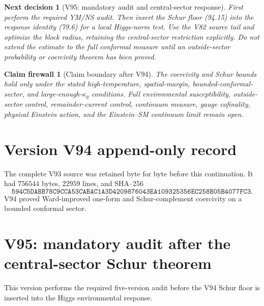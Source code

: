 \documentclass[11pt]{article}
\newtheorem{firewall}[theorem]{Claim firewall}
\newtheorem{decision}[theorem]{Next decision}
\theoremstyle{remark}
\begin{document}
\begin{decision}[V95: mandatory audit and central-sector response]
\label{dec:v17v94-next}
First perform the required YM/NS audit.  Then insert the Schur floor
(94.15) into the response identity (79.6) for a local Higgs-norm test.
Use the V82 source tail and optimize the block radius, retaining the
central-sector restriction explicitly.  Do not extend the estimate to
the full conformal measure until an outside-sector probability or
coercivity theorem has been proved.
\end{decision}

\begin{firewall}[Claim boundary after V94]
\label{fire:v17v94}
The coercivity and Schur bounds hold only under the stated
high-temperature, spatial-margin, bounded-conformal-sector, and
large-enough-\(\kappa_g\) conditions.  Full environmental
susceptibility, outside-sector control, remainder-current control,
continuum measure, gauge cofinality, physical Einstein action, and the
Einstein--SM continuum limit remain open.
\end{firewall}

\section*{Version V94 append-only record}
The complete V93 source was retained byte for byte before this
continuation.  It had \(756544\) bytes, \(22959\) lines, and SHA--256
\[
 \texttt{594C5DABB78C9CCA53CABAC1A3D4209876043EA109325356EC258B05B4077FC3}.
\]
V94 proved Ward-improved one-form and Schur-complement coercivity on a
bounded conformal sector.


\section{V95: mandatory audit after the central-sector Schur theorem}
\label{sec:v17v95}

This version performs the required five-version audit before the
V94 Schur floor is inserted into the Higgs environmental response.
\end{document}
